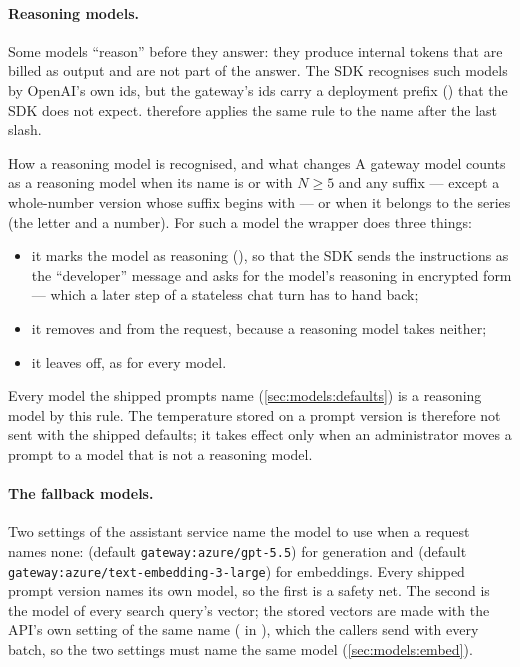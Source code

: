 \paragraph{Reasoning models.} Some models \enquote{reason} before they answer: they produce
internal tokens that are billed as output and are not part of the answer. The SDK recognises
such models by OpenAI's own ids, but the gateway's ids carry a deployment prefix
() that the SDK does not expect.  therefore applies the
same rule to the name after the last slash.

\begin{codebox}{How a reasoning model is recognised, and what changes}
A gateway model counts as a reasoning model when its name is  or
 with $N \ge 5$ and any suffix --- except a whole-number version whose suffix
begins with  --- or when it belongs to the  series (the letter and a
number). For such a model the wrapper does three things:
\begin{itemize}
  \item it marks the model as reasoning (), so that the SDK sends the
    instructions as the \enquote{developer} message and asks for the model's reasoning in
    encrypted form --- which a later step of a stateless chat turn has to hand back;
  \item it removes  and  from the request, because a reasoning
    model takes neither;
  \item it leaves  off, as for every model.
\end{itemize}
Every model the shipped prompts name (\cref{sec:models:defaults}) is a reasoning model by
this rule. The temperature stored on a prompt version is therefore not sent with the shipped
defaults; it takes effect only when an administrator moves a prompt to a model that is not a
reasoning model.
\end{codebox}

\paragraph{The fallback models.} Two settings of the assistant service name the model to use
when a request names none:  (default \texttt{gateway:azure/gpt-5.5}) for
generation and  (default \texttt{gateway:azure/text-embedding-3-large})
for embeddings. Every shipped prompt version names its own model, so the first is a safety
net. The second is the model of every search query's vector; the stored vectors are made with
the API's own setting of the same name ( in ), which
the callers send with every batch, so the two settings must name the same model
(\cref{sec:models:embed}).


